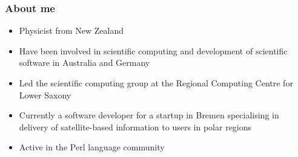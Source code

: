 \begin{frame}
\frametitle{About me}
\begin{itemize}
    \item Physicist from New Zealand
    \item Have been involved in scientific computing and development of
        scientific software in Australia and Germany
    \item Led the scientific computing group at the Regional Computing
        Centre for Lower Saxony
    \item Currently a software developer for a startup in Bremen
        specialising in delivery of satellite-based information to users in
        polar regions
    \item Active in the Perl language community
\end{itemize}
\end{frame}

